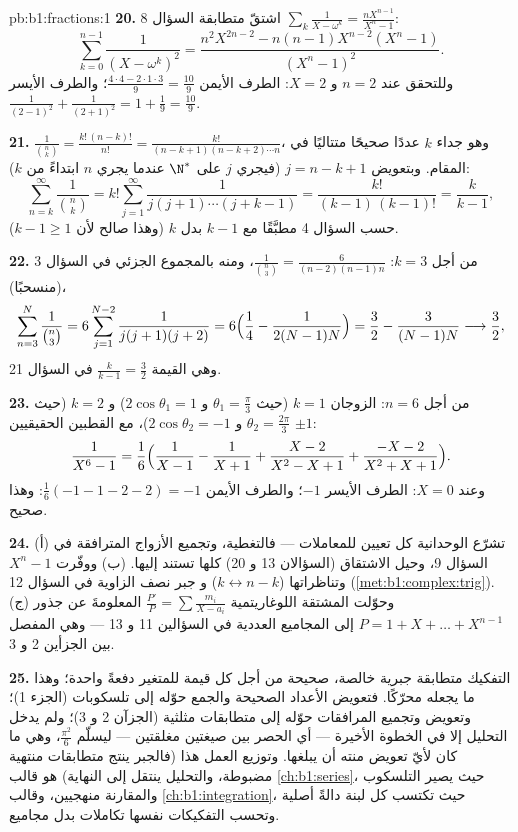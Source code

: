\begin{solution}{pb:b1:fractions:1}
\textbf{20.} اشتقّ متطابقة السؤال 8
$\sum_k\frac1{X-\omega^k} = \frac{nX^{n-1}}{X^n-1}$:
\[
\sum_{k=0}^{n-1}\frac1{(X - \omega^k)^2}
= \frac{n^2X^{2n-2} - n(n-1)X^{n-2}(X^n - 1)}{(X^n - 1)^2} .
\]
وللتحقق عند $n = 2$ و $X = 2$: الطرف الأيمن $\frac{4\cdot4 -
2\cdot1\cdot3}{9} = \frac{10}9$؛ والطرف الأيسر $\frac1{(2-1)^2} +
\frac1{(2+1)^2} = 1 + \frac19 = \frac{10}9$.

\textbf{21.} $\frac1{\binom nk} = \frac{k!\,(n-k)!}{n!} =
\frac{k!}{(n-k+1)(n-k+2)\cdots n}$، وهو جداء $k$ عددًا صحيحًا
متتاليًا في المقام. وبتعويض $j = n - k + 1$ (فيجري $j$
على $\N^*$ عندما يجري $n$ ابتداءً من $k$):
\[
\sum_{n=k}^{\infty}\frac1{\binom nk}
= k!\sum_{j=1}^{\infty}\frac1{j(j+1)\cdots(j+k-1)}
= \frac{k!}{(k-1)\,(k-1)!} = \frac{k}{k-1} ,
\]
حسب السؤال 4 مطبَّقًا مع $k - 1$ بدل $k$ (وهذا صالح لأن
$k - 1 \geq 1$).

\textbf{22.} من أجل $k = 3$: $\frac1{\binom n3} =
\frac6{(n-2)(n-1)n}$، ومنه بالمجموع الجزئي في السؤال 3 (منسحبًا)،
\[
\sum_{n=3}^{N}\frac1{\binom n3}
= 6\sum_{j=1}^{N-2}\frac1{j(j+1)(j+2)}
= 6\Bigl(\frac14 - \frac1{2(N-1)N}\Bigr)
= \frac32 - \frac3{(N-1)N}
\longrightarrow \frac32 ,
\]
وهي القيمة $\frac k{k-1} = \frac32$ في السؤال 21.

\textbf{23.} من أجل $n = 6$: الزوجان $k = 1$ (حيث $\theta_1 = \frac\pi3$
و $2\cos\theta_1 = 1$) و $k = 2$ (حيث $\theta_2 = \frac{2\pi}3$
و $2\cos\theta_2 = -1$)، مع القطبين الحقيقيين $\pm1$:
\[
\frac1{X^6-1} = \frac16\Bigl(\frac1{X-1} - \frac1{X+1}
+ \frac{X - 2}{X^2 - X + 1}
+ \frac{-X - 2}{X^2 + X + 1}\Bigr) .
\]
وعند $X = 0$: الطرف الأيسر $-1$؛ والطرف الأيمن $\frac16(-1 - 1 - 2 - 2)
= -1$: وهذا صحيح.

\textbf{24.} (أ) تشرّع الوحدانية كل تعيين
للمعاملات --- فالتغطية، وتجميع الأزواج المترافقة في
السؤال 9، وحيل الاشتقاق (السؤالان 13 و 20)
كلها تستند إليها. (ب) ووفّرت   $X^n -
1$ وتناظراتها ($k \leftrightarrow n-k$) و
جبر نصف الزاوية في السؤال 12
(\cref{met:b1:complex:trig}). (ج) وحوّلت المشتقة اللوغاريتمية
$\frac{P'}P = \sum\frac{m_i}{X-a_i}$ المعلومةَ عن
جذور $P = 1 + X + \dots + X^{n-1}$ إلى المجاميع
العددية في السؤالين 11 و 13 --- وهي المفصل بين الجزأين 2 و
3.

\textbf{25.} التفكيك متطابقة جبرية خالصة،
صحيحة من أجل كل قيمة للمتغير دفعةً واحدة؛ وهذا ما يجعله
محرّكًا. فتعويض الأعداد الصحيحة والجمع حوّله إلى
تلسكوبات (الجزء 1)؛ وتعويض  وتجميع
المرافقات حوّله إلى متطابقات مثلثية (الجزآن 2 و
3)؛ ولم يدخل التحليل إلا في الخطوة الأخيرة --- أي
الحصر بين صيغتين مغلقتين --- ليسلّم $\frac{\pi^2}6$،
وهي  ما كان لأيّ تعويض منته أن يبلغها. وتوزيع
العمل هذا (فالجبر ينتج متطابقات منتهية مضبوطة، والتحليل ينتقل
إلى النهاية) هو قالب \cref{ch:b1:series}، حيث
يصير التلسكوب والمقارنة منهجيين، وقالب
\cref{ch:b1:integration}، حيث تكتسب كل لبنة دالةً أصلية
وتحسب التفكيكات نفسها تكاملات بدل مجاميع.
\end{solution}

